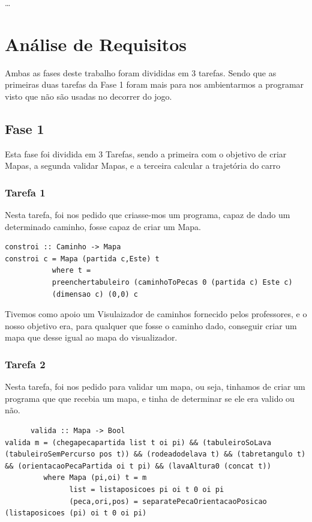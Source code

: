 \documentclass[a4paper]{report} %
\begin{document}
  \ldots

\chapter{Análise de Requisitos}
\large Ambas as fases deste trabalho foram divididas em 3 tarefas. Sendo que as primeiras duas tarefas da Fase 1 foram mais para nos ambientarmos a programar visto que não são usadas no decorrer do jogo.\par


\section{Fase 1}
\label{sec:analisefase1}

\large{Esta fase foi dividida em 3 Tarefas, sendo a primeira com o objetivo de criar Mapas, a segunda validar Mapas, e a terceira calcular a trajetória do carro}

\subsection{Tarefa 1}
      Nesta tarefa, foi nos pedido que criasse-mos um programa, capaz de dado um determinado caminho, fosse capaz de criar um Mapa.
      
      
 \begin{verbatim}
constroi :: Caminho -> Mapa
constroi c = Mapa (partida c,Este) t
           where t = 
           preenchertabuleiro (caminhoToPecas 0 (partida c) Este c) 
           (dimensao c) (0,0) c  
\end{verbatim}

 Tivemos como apoio um Visulaizador de caminhos fornecido pelos professores, e o nosso objetivo era, para qualquer que fosse o caminho dado, conseguir criar um mapa que desse igual ao mapa do visualizador.
 
\subsection{Tarefa 2}
      Nesta tarefa, foi nos pedido para validar um mapa, ou seja, tinhamos de criar um programa que que recebia um mapa, e tinha de determinar se ele era valido ou não.
     
     
     \begin{verbatim} 
      valida :: Mapa -> Bool
valida m = (chegapecapartida list t oi pi) && (tabuleiroSoLava (tabuleiroSemPercurso pos t)) && (rodeadodelava t) && (tabretangulo t) && (orientacaoPecaPartida oi t pi) && (lavaAltura0 (concat t))
         where Mapa (pi,oi) t = m
               list = listaposicoes pi oi t 0 oi pi
               (peca,ori,pos) = separatePecaOrientacaoPosicao (listaposicoes (pi) oi t 0 oi pi)


\end{verbatim}
\end{document}
